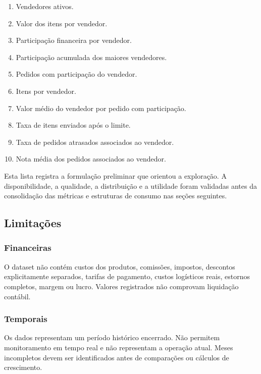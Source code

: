 \documentclass[12pt,a4paper]{article}
\providecommand{\tightlist}{
  \setlength{\itemsep}{0pt}\setlength{\parskip}{0pt}
}
\begin{document}
\begin{enumerate}
\def\labelenumi{\arabic{enumi}.}
\setcounter{enumi}{10}
\tightlist
\item
  Vendedores ativos.
\item
  Valor dos itens por vendedor.
\item
  Participação financeira por vendedor.
\item
  Participação acumulada dos maiores vendedores.
\item
  Pedidos com participação do vendedor.
\item
  Itens por vendedor.
\item
  Valor médio do vendedor por pedido com participação.
\item
  Taxa de itens enviados após o limite.
\item
  Taxa de pedidos atrasados associados ao vendedor.
\item
  Nota média dos pedidos associados ao vendedor.
\end{enumerate}

Esta lista registra a formulação preliminar que orientou a exploração. A
disponibilidade, a qualidade, a distribuição e a utilidade foram
validadas antes da consolidação das métricas e estruturas de consumo nas
seções seguintes.

\subsection{Limitações}\label{docs__analytics__contrato_analitico.md__limitauxe7uxf5es}

\subsubsection{Financeiras}\label{docs__analytics__contrato_analitico.md__financeiras}

O dataset não contém custos dos produtos, comissões, impostos, descontos
explicitamente separados, tarifas de pagamento, custos logísticos reais,
estornos completos, margem ou lucro. Valores registrados não comprovam
liquidação contábil.

\subsubsection{Temporais}\label{docs__analytics__contrato_analitico.md__temporais}

Os dados representam um período histórico encerrado. Não permitem
monitoramento em tempo real e não representam a operação atual. Meses
incompletos devem ser identificados antes de comparações ou cálculos de
crescimento.
\end{document}
